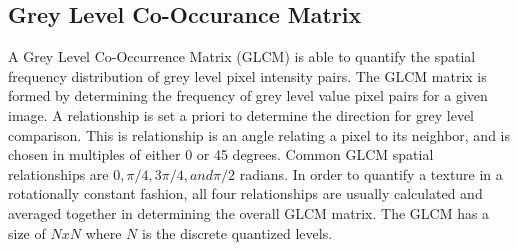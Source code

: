 \subsection{Grey Level Co-Occurance Matrix}
A Grey Level Co-Occurrence Matrix (GLCM) is able to quantify the spatial frequency distribution of grey level pixel intensity pairs. The GLCM matrix is formed by determining the frequency of grey level value pixel pairs for a given image.  A relationship is set a priori to determine the direction for grey level comparison.  This is relationship is an angle relating a pixel to its neighbor, and is chosen in multiples of either 0 or 45 degrees.  Common GLCM spatial relationships are $0, \pi/4, 3\pi/4, and \pi/2$ radians. In order to quantify a texture in a rotationally constant fashion, all four relationships are usually calculated and averaged together in determining the overall GLCM matrix.  The GLCM has a size of $N x N$ where $N$ is the discrete quantized levels.

